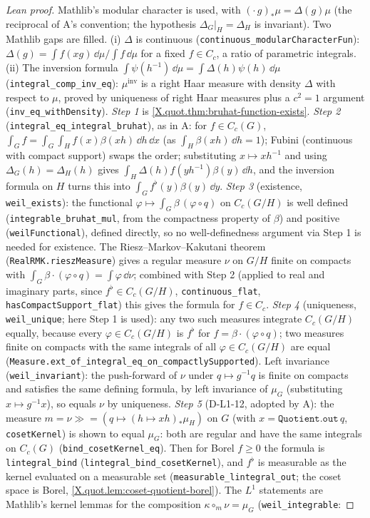 \begin{proof}[Lean proof]
Mathlib's modular character is used, with $(\cdot\,g)_*\mu=\Delta(g)\mu$ (the reciprocal of A's convention; the hypothesis $\Delta_G|_H=\Delta_H$ is invariant). Two Mathlib gaps are filled. (i) $\Delta$ is continuous (\texttt{continuous\_modularCharacterFun}): $\Delta(g)=\int f(xg)\,\dd\mu\big/\int f\,\dd\mu$ for a fixed $f\in C_c$, a ratio of parametric integrals. (ii) The inversion formula $\int\psi(h^{-1})\,\dd\mu=\int\Delta(h)\psi(h)\,\dd\mu$ (\texttt{integral\_comp\_inv\_eq}): $\mu^{\mathrm{inv}}$ is a right Haar measure with density $\Delta$ with respect to $\mu$, proved by uniqueness of right Haar measures plus a $c^2=1$ argument (\texttt{inv\_eq\_withDensity}). \emph{Step 1} is \cref{X.quot.thm:bruhat-function-exists}. \emph{Step 2} (\texttt{integral\_eq\_integral\_bruhat}), as in A: for $f\in C_c(G)$, $\int_Gf=\int_G\!\int_Hf(x)\beta(xh)\,\dd h\,\dd x$ (as $\int_H\beta(xh)\,\dd h=1$); Fubini (continuous with compact support) swaps the order; substituting $x\mapsto xh^{-1}$ and using $\Delta_G(h)=\Delta_H(h)$ gives $\int_H\Delta(h)f(yh^{-1})\beta(y)\,\dd h$, and the inversion formula on $H$ turns this into $\int_Gf^\flat(y)\beta(y)\,\dd y$. \emph{Step 3} (existence, \texttt{weil\_exists}): the functional $\varphi\mapsto\int_G\beta\,(\varphi\circ q)$ on $C_c(G/H)$ is well defined (\texttt{integrable\_bruhat\_mul}, from the compactness property of $\beta$) and positive (\texttt{weilFunctional}), defined directly, so no well-definedness argument via Step 1 is needed for existence. The Riesz--Markov--Kakutani theorem (\texttt{RealRMK.rieszMeasure}) gives a regular measure $\nu$ on $G/H$ finite on compacts with $\int_G\beta\cdot(\varphi\circ q)=\int\varphi\,\dd\nu$; combined with Step 2 (applied to real and imaginary parts, since $f^\flat\in C_c(G/H)$, \texttt{continuous\_flat}, \texttt{hasCompactSupport\_flat}) this gives the formula for $f\in C_c$. \emph{Step 4} (uniqueness, \texttt{weil\_unique}; here Step 1 is used): any two such measures integrate $C_c(G/H)$ equally, because every $\varphi\in C_c(G/H)$ is $f^\flat$ for $f=\beta\cdot(\varphi\circ q)$; two measures finite on compacts with the same integrals of all $\varphi\in C_c(G/H)$ are equal (\texttt{Measure.ext\_of\_integral\_eq\_on\_compactlySupported}). Left invariance (\texttt{weil\_invariant}): the push-forward of $\nu$ under $q\mapsto g^{-1}q$ is finite on compacts and satisfies the same defining formula, by left invariance of $\mu_G$ (substituting $x\mapsto g^{-1}x$), so equals $\nu$ by uniqueness. \emph{Step 5} (D-L1-12, adopted by A): the measure $m=\nu\mathbin{\gg\!\!=}(q\mapsto(h\mapsto xh)_*\mu_H)$ on $G$ (with $x=\texttt{Quotient.out}\,q$, \texttt{cosetKernel}) is shown to equal $\mu_G$: both are regular and have the same integrals on $C_c(G)$ (\texttt{bind\_cosetKernel\_eq}). Then for Borel $f\ge0$ the formula is \texttt{lintegral\_bind} (\texttt{lintegral\_bind\_cosetKernel}), and $f^\flat$ is measurable as the kernel evaluated on a measurable set (\texttt{measurable\_lintegral\_out}; the coset space is Borel, \cref{X.quot.lem:coset-quotient-borel}). The $L^1$ statements are Mathlib's kernel lemmas for the composition $\kappa\circ_m\nu=\mu_G$ (\texttt{weil\_integrable}: 
\end{proof}
